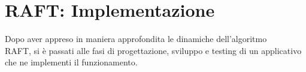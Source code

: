 \chapter{RAFT: Implementazione}
	Dopo aver appreso in maniera approfondita le dinamiche dell'algoritmo\\ RAFT, si è passati alle fasi di progettazione, sviluppo e testing di un applicativo che ne implementi il funzionamento. 






